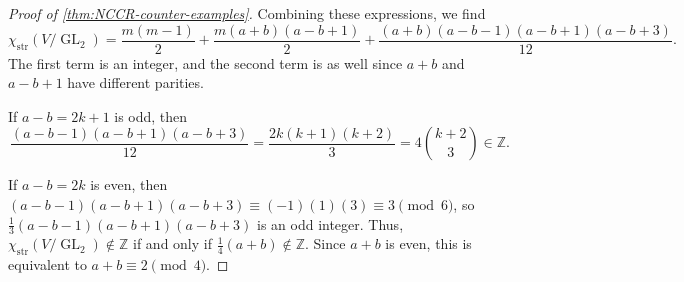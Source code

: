 \documentclass[12pt,a4paper]{amsart}
\theoremstyle{definition}
\newcommand{\ZZ}{\mathbb{Z}}
\newcommand{\str}{\mathrm{str}}
\renewcommand{\1}{\textbf{1}}
\newcommand{\<}{\langle}
\renewcommand{\>}{\rangle}
\DeclareMathOperator{\GL}{GL}
\begin{document}
\begin{proof}[{Proof of \autoref{thm:NCCR-counter-examples}}]
Combining these expressions, we find
\[
	\chi_{\str}(V/\GL_2)=\frac{m(m-1)}{2}+\frac{m(a+b)(a-b+1)}{2}+\frac{(a+b)(a-b-1)(a-b+1)(a-b+3)}{12}.
\]
The first term is an integer, and the second term is as well since $a+b$ and $a-b+1$ have different parities. 

If $a-b=2k+1$ is odd, then
\[
	\frac{(a-b-1)(a-b+1)(a-b+3)}{12}=\frac{2k(k+1)(k+2)}{3}=4{k+2\choose 3}\in\ZZ.
\]

If $a-b=2k$ is even, then $(a-b-1)(a-b+1)(a-b+3)\equiv(-1)(1)(3)\equiv3\pmod{6}$, so $\frac{1}{3}(a-b-1)(a-b+1)(a-b+3)$ is an odd integer. Thus, $\chi_{\str}(V/\GL_2)\not\in\ZZ$ if and only if $\frac{1}{4}(a+b)\not\in\ZZ$. Since $a+b$ is even, this is equivalent to $a+b\equiv2\pmod{4}$.
\end{proof}
















\end{document}
